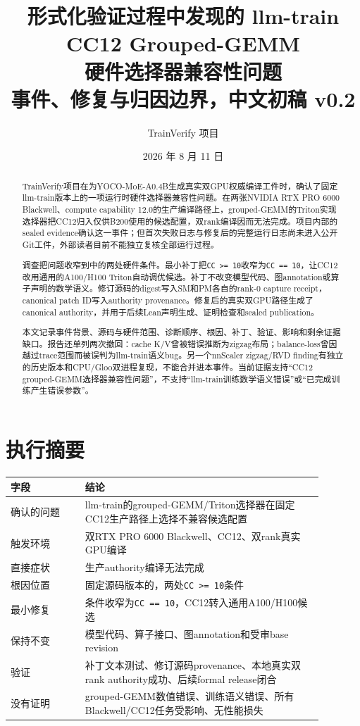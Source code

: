 \documentclass[10.5pt,a4paper]{ctexart}
\title{形式化验证过程中发现的 llm-train CC12 Grouped-GEMM\\硬件选择器兼容性问题\\\large 事件、修复与归因边界，中文初稿 v0.2}
\author{TrainVerify 项目}
\date{2026 年 8 月 11 日}
\begin{document}
\maketitle

\begin{abstract}
TrainVerify项目在为YOCO-MoE-A0.4B生成真实双GPU权威编译工件时，确认了固定llm-train版本上的一项运行时硬件选择器兼容性问题。在两张NVIDIA RTX PRO 6000 Blackwell、compute capability 12.0的生产编译路径上，grouped-GEMM的Triton实现选择器把CC12归入仅供B200使用的候选配置，双rank编译因而无法完成。项目内部的sealed evidence确认这一事件；但首次失败日志与修复后的完整运行日志尚未进入公开Git工件，外部读者目前不能独立复核全部运行过程。

调查把问题收窄到中的两处硬件条件。最小补丁把\texttt{CC >= 10}收窄为\texttt{CC == 10}，让CC12改用通用的A100/H100 Triton自动调优候选。补丁不改变模型代码、图annotation或算子声明的数学语义。修订源码的digest写入SM和PM各自的rank-0 capture receipt，canonical patch ID写入authority provenance。修复后的真实双GPU路径生成了canonical authority，并用于后续Lean声明生成、证明检查和sealed publication。

本文记录事件背景、源码与硬件范围、诊断顺序、根因、补丁、验证、影响和剩余证据缺口。报告还单列两次撤回：cache K/V曾被错误推断为zigzag布局；balance-loss曾因越过trace范围而被误判为llm-train语义bug。另一个nnScaler zigzag/RVD finding有独立的历史版本和CPU/Gloo双进程复现，不能合并进本事件。当前证据支持“CC12 grouped-GEMM选择器兼容性问题”，不支持“llm-train训练数学语义错误”或“已完成训练产生错误参数”。
\end{abstract}

\section{执行摘要}

\begin{longtable}{L{0.21\linewidth}L{0.67\linewidth}}
\toprule
字段 & 结论 \\
\midrule
确认的问题 & llm-train的grouped-GEMM/Triton选择器在固定CC12生产路径上选择不兼容候选配置 \\
触发环境 & 双RTX PRO 6000 Blackwell、CC12、双rank真实GPU编译 \\
直接症状 & 生产authority编译无法完成 \\
根因位置 & 固定源码版本的，两处\texttt{CC >= 10}条件 \\
最小修复 & 条件收窄为\texttt{CC == 10}，CC12转入通用A100/H100候选 \\
保持不变 & 模型代码、算子接口、图annotation和受审base revision \\
验证 & 补丁文本测试、修订源码provenance、本地真实双rank authority成功、后续formal release闭合 \\
没有证明 & grouped-GEMM数值错误、训练语义错误、所有Blackwell/CC12任务受影响、无性能损失 \\
\bottomrule
\end{longtable}
\end{document}
